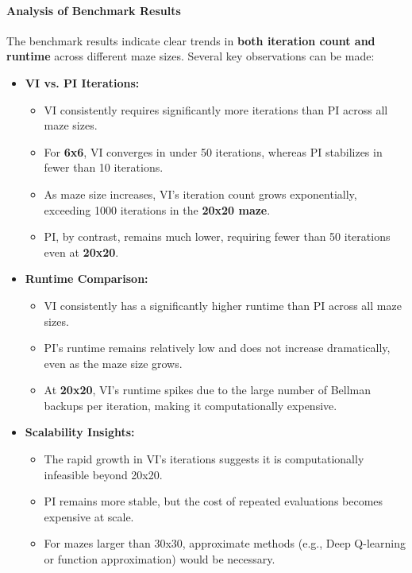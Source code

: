 \documentclass[11pt]{article}
\begin{document}
\newpage
\paragraph{Analysis of Benchmark Results} \leavevmode\newline
The benchmark results indicate clear trends in \textbf{both iteration count and runtime} across different maze sizes. Several key observations can be made:

\begin{itemize}
    \item \textbf{VI vs. PI Iterations:} 
    \begin{itemize}
        \item VI consistently requires significantly more iterations than PI across all maze sizes.
        \item For \textbf{6x6}, VI converges in under 50 iterations, whereas PI stabilizes in fewer than 10 iterations.
        \item As maze size increases, VI's iteration count grows exponentially, exceeding 1000 iterations in the \textbf{20x20 maze}.
        \item PI, by contrast, remains much lower, requiring fewer than 50 iterations even at \textbf{20x20}.
    \end{itemize}
    
    \item \textbf{Runtime Comparison:}  
    \begin{itemize}
        \item VI consistently has a significantly higher runtime than PI across all maze sizes.
        \item PI’s runtime remains relatively low and does not increase dramatically, even as the maze size grows.
        \item At \textbf{20x20}, VI’s runtime spikes due to the large number of Bellman backups per iteration, making it computationally expensive.
    \end{itemize}

    \item \textbf{Scalability Insights:}
    \begin{itemize}
        \item The rapid growth in VI’s iterations suggests it is computationally infeasible beyond 20x20.
        \item PI remains more stable, but the cost of repeated evaluations becomes expensive at scale.
        \item For mazes larger than 30x30, approximate methods (e.g., Deep Q-learning or function approximation) would be necessary.
    \end{itemize}
\end{itemize}
\end{document}
